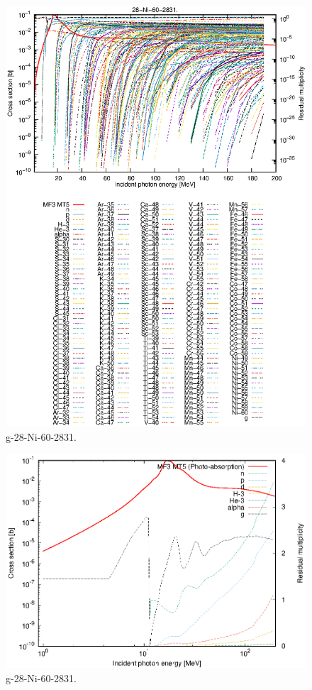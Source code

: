 \begin{figure}
 \includegraphics[width=\linewidth]{eps/g_28-Ni-60_2831.eps}
  \caption{g-28-Ni-60-2831.}
\end{figure}
\newpage \clearpage

\begin{figure}
 \includegraphics[width=\linewidth]{eps-log/g_28-Ni-60_2831.eps}
 \caption{g-28-Ni-60-2831.}
\end{figure}
\newpage \clearpage

